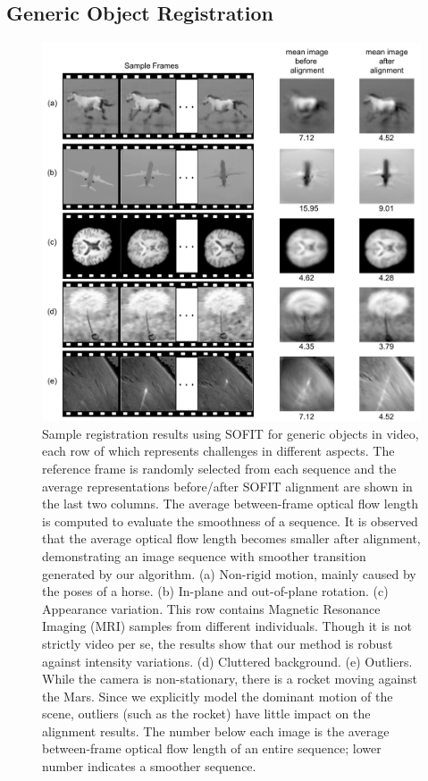 \documentclass[10pt,journal]{IEEEtran}
\begin{document}
\subsection{Generic Object Registration}


\begin{figure}[htbp]
	\centering
		\includegraphics[width=.65\textwidth]{fig/object_ex.png}
	\caption{Sample registration results using SOFIT for generic objects in video, each row of which represents challenges in different aspects. The reference frame is randomly selected from each sequence and the average representations before/after SOFIT alignment are shown in the last two columns. The average between-frame optical flow length is computed to evaluate the smoothness of a sequence. It is observed that the average optical flow length becomes smaller after alignment, demonstrating an image sequence with smoother transition generated by our algorithm. (a) Non-rigid motion, mainly caused by the poses of a horse. (b) In-plane and out-of-plane rotation. (c) Appearance variation. This row contains Magnetic Resonance Imaging (MRI) samples from different individuals. Though it is not strictly video per se, the results show that our method is robust against intensity variations. (d) Cluttered background. (e) Outliers. While the camera is non-stationary, there is a rocket moving against the Mars. Since we explicitly model the dominant motion of the scene, outliers (such as the rocket) have little impact on the alignment results. The number below each image is the average between-frame optical flow length of an entire sequence; lower number indicates a smoother sequence.}
	\label{fig:object_ex}
\end{figure}
\end{document}
